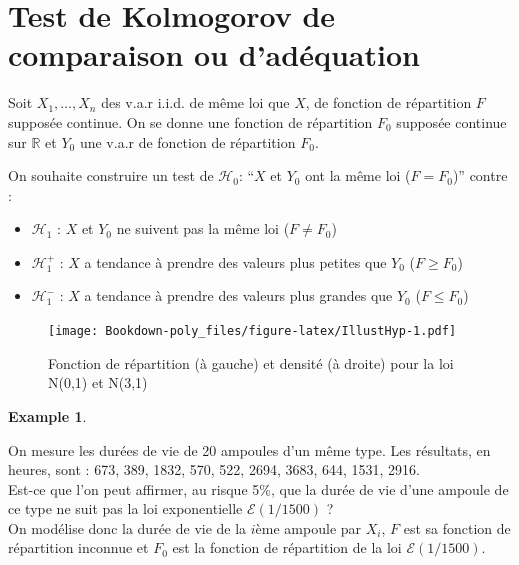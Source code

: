 \documentclass[
]{book}
\providecommand{\tightlist}{%
  \setlength{\itemsep}{0pt}\setlength{\parskip}{0pt}}
\theoremstyle{definition}
\theoremstyle{definition}
\newtheorem{example}{Example}[chapter]
\theoremstyle{definition}
\theoremstyle{definition}
\theoremstyle{remark}
\begin{document}
\hypertarget{test-de-kolmogorov-de-comparaison-ou-daduxe9quation}{%
\section{Test de Kolmogorov de comparaison ou d'adéquation}\label{test-de-kolmogorov-de-comparaison-ou-daduxe9quation}}

Soit \(X_1, \ldots , X_n\) des v.a.r i.i.d. de même loi que \(X\), de fonction de répartition \(F\) supposée continue. On se donne une fonction de répartition \(F_0\) supposée continue sur \(\mathbb{R}\) et \(Y_0\) une v.a.r de fonction de répartition \(F_0\).

On souhaite construire un test de \(\mathcal{H}_0\): ``\(X\) et \(Y_0\) ont la même loi (\(F=F_0\))'' contre :

\begin{itemize}
\tightlist
\item
  \(\mathcal{H}_1\) : \(X\) et \(Y_0\) ne suivent pas la même loi (\(F\neq F_0\))
\item
  \(\mathcal{H}_1^{+}\) : \(X\) a tendance à prendre des valeurs plus petites que \(Y_0\) (\(F \geq F_0\))
\item
  \(\mathcal{H}_1^{-}\) : \(X\) a tendance à prendre des valeurs plus grandes que \(Y_0\) (\(F \leq F_0\))
\end{itemize}

\begin{figure}
\centering
\texttt{[image: Bookdown-poly\_files/figure-latex/IllustHyp-1.pdf]}
\caption{\label{fig:IllustHyp}\label{IllustHyp} Fonction de répartition (à gauche) et densité (à droite) pour la loi N(0,1) et N(3,1)}
\end{figure}

\begin{example}
\protect\hypertarget{exm:unlabeled-div-17}{}\label{exm:unlabeled-div-17}

On mesure les durées de vie de 20 ampoules d'un même type. Les résultats, en heures, sont :
673, 389, 1832, 570, 522, 2694, 3683, 644, 1531, 2916.\\
Est-ce que l'on peut affirmer, au risque 5\(\%\), que la durée de vie d'une ampoule de ce type ne suit pas la loi exponentielle \(\mathcal E(1/1500)\) ?\\
On modélise donc la durée de vie de la \(i\)ème ampoule par \(X_i\), \(F\) est sa fonction de répartition inconnue et \(F_0\) est la fonction de répartition de la loi \(\mathcal E(1/1500)\).

\end{example}
\end{document}
